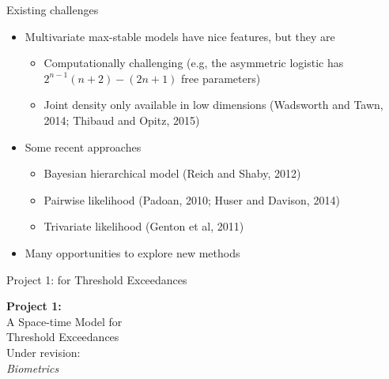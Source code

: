 \documentclass{beamer}
\begin{document}
\begin{frame}{Existing challenges}
	\begin{itemize} \setlength{\itemsep}{1em}
		\item Multivariate max-stable models have nice features, but they are
		\begin{itemize} \setlength{\itemsep}{0.5em}
			\item Computationally challenging (e.g,  the asymmetric logistic has $2^{n-1}(n + 2) - (2n + 1)$ free parameters)
			\item Joint density only available in low dimensions (Wadsworth and Tawn, 2014; Thibaud and Opitz, 2015)
		\end{itemize}
		\item Some recent approaches
		\begin{itemize} \setlength{\itemsep}{0.5em}
			\item Bayesian hierarchical model (Reich and Shaby, 2012)
			\item Pairwise likelihood (Padoan, 2010; Huser and Davison, 2014)
			\item Trivariate likelihood (Genton et al, 2011)
		\end{itemize}
		\item Many opportunities to explore new methods
	\end{itemize}
\end{frame}

\begin{frame}{Project 1: \Skewt{} for Threshold Exceedances}
	\begin{center}
		\LARGE
		\textbf{Project 1:}\\ [1em]
		A Space-time \Skewt{} Model for \\
		Threshold Exceedances\\ [2em]
		\normalsize
		Under revision: \\
		\emph{Biometrics}
	\end{center}	
\end{frame}
\end{document}
